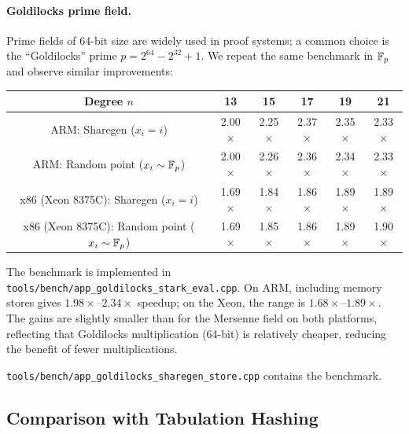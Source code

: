 \paragraph{Goldilocks prime field.}
Prime fields of 64-bit size are widely used in proof systems; a common choice is the
``Goldilocks'' prime $p = 2^{64}-2^{32}+1$.
We repeat the same benchmark in $\mathbb{F}_p$ and observe similar improvements:
\begin{center}
\begin{tabular}{c|ccccc}
Degree $n$ & 13 & 15 & 17 & 19 & 21 \\
\hline
ARM: Sharegen ($x_i=i$) & 2.00$\times$ & 2.25$\times$ & 2.37$\times$ & 2.35$\times$ & 2.33$\times$ \\
ARM: Random point ($x_i \sim \mathbb{F}_p$) & 2.00$\times$ & 2.26$\times$ & 2.36$\times$ & 2.34$\times$ & 2.33$\times$ \\
\hline
x86 (Xeon 8375C): Sharegen ($x_i=i$) & 1.69$\times$ & 1.84$\times$ & 1.86$\times$ & 1.89$\times$ & 1.89$\times$ \\
x86 (Xeon 8375C): Random point ($x_i \sim \mathbb{F}_p$) & 1.69$\times$ & 1.85$\times$ & 1.86$\times$ & 1.89$\times$ & 1.90$\times$
\end{tabular}
\end{center}
The benchmark is implemented in \texttt{tools/bench/\allowbreak app\_goldilocks\_stark\_eval.cpp}.
On ARM, including memory stores gives $1.98\times$--$2.34\times$ speedup;
on the Xeon, the range is $1.68\times$--$1.89\times$.
The gains are slightly smaller than for the Mersenne field on both platforms, reflecting
that Goldilocks multiplication (64-bit) is relatively cheaper,
reducing the benefit of fewer multiplications.
\par\noindent\texttt{tools/bench/\allowbreak app\_goldilocks\_sharegen\_store.cpp} contains the benchmark.

\subsection{Comparison with Tabulation Hashing}
\label{sec:experiments:tabulation}

